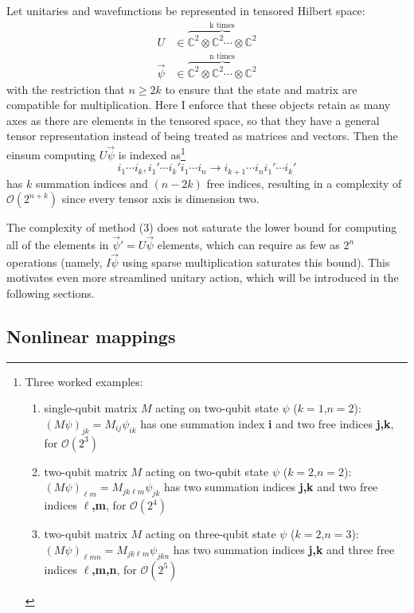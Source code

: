 \documentclass{article}
\begin{document}
\begin{enumerate}
	Let unitaries and wavefunctions be represented in tensored Hilbert space:
	\begin{align}\label{eq:tensorU}
		U &\in \overbrace{ \mathbb{C}^2 \otimes \mathbb{C}^2 \cdots  \otimes \mathbb{C}^2}^{\text{k times}} \\
		\label{eq:tensorpsi}
		\vec{\psi} &\in \overbrace{ \mathbb{C}^2 \otimes \mathbb{C}^2 \cdots  \otimes \mathbb{C}^2}^{\text{n times}}
	\end{align}
	with the restriction that $n \geq 2k$ to ensure that the state and matrix are compatible for multiplication. Here I enforce that these objects retain as many axes as there are elements in the tensored space, so that they have a general tensor representation instead of being treated as matrices and vectors. Then the einsum computing $U\vec{\psi}$ is indexed as\footnote{Three worked examples:
		\begin{enumerate}
			\item single-qubit matrix $M$ acting on two-qubit state $\psi$ ($k=1$,$n=2$): $(M\psi)_{jk} = M_{ij} \psi_{ik}$ has one summation index \textbf{i} and two free indices \textbf{j,k}, for $\mathcal{O}(2^{3})$
			\item two-qubit matrix $M$ acting on two-qubit state $\psi$ ($k=2$,$n=2$): $(M\psi)_{\ell m} = M_{jk\ell m} \psi_{jk}$ has two summation indices \textbf{j,k} and two free indices \textbf{$\ell$,m}, for $\mathcal{O}(2^{4})$
			\item two-qubit matrix $M$ acting on three-qubit state $\psi$ ($k=2$,$n=3$): $(M\psi)_{\ell m n} = M_{jk\ell m} \psi_{jk n}$ has two summation indices \textbf{j,k} and three free indices \textbf{$\ell$,m,n}, for $\mathcal{O}(2^{5})$
		\end{enumerate}		}
	$$i_1 \cdots i_{k}, i_1' \cdots i_{k}' i_1 \cdots i_n \rightarrow  i_{k + 1} \cdots i_n i_1' \cdots i_k ' $$ has $k$ summation indices and $(n-2k)$ free indices, resulting in a complexity of $\mathcal{O}(2^{n + k})$ since every tensor axis is dimension two. 
\end{enumerate}

The complexity of method (3) does not saturate the lower bound for computing all of the elements in $\vec{\psi}' = U \vec{\psi}$ elements, which can require as few as $2^{n}$ operations (namely, $I \vec{\psi}$ using sparse multiplication saturates this bound). This motivates even more streamlined unitary action, which will be introduced in the following sections.

\subsection{Nonlinear mappings}\label{sec:nonlinear}
\end{document}
